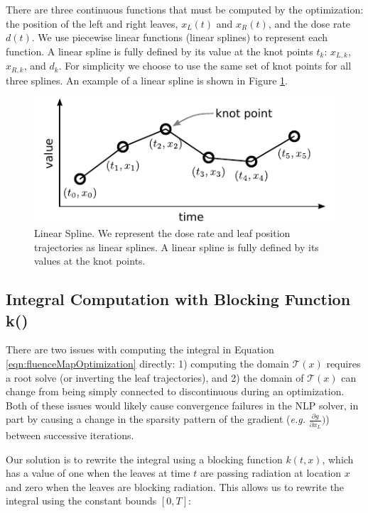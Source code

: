 \documentclass{iopart}
\begin{document}
There are three continuous functions that must be computed by the optimization: the position of the left and right leaves, $x_L(t)$ and $x_R(t)$, and the dose rate $d(t)$. We use piecewise linear functions (linear splines) to represent each function. A linear spline is fully defined by its value at the knot points $t_k$: $x_{L,k}$, $x_{R,k}$, and $d_k$. For simplicity we choose to use the same set of knot points for all three splines. An example of a linear spline is shown in Figure \ref{fig:linearSpline}.

\begin{figure}
  \centering
  \includegraphics{fig/linearSpline.pdf}
  \caption{Linear Spline. We represent the dose rate and leaf position trajectories as linear splines. A linear spline is fully defined by its values at the knot points. }
  \label{fig:linearSpline}
\end{figure}

\subsection{Integral Computation with Blocking Function k()}
\label{sec:IntegralComputationWithBlockingFunction}

There are two issues with computing the integral in Equation \ref{eqn:fluenceMapOptimization} directly: 1) computing the domain $\mathcal{T}(x)$ requires a root solve (or inverting the leaf trajectories), and 2) the domain of $\mathcal{T}(x)$ can change from being simply connected to discontinuous during an optimization. Both of these issues would likely cause convergence failures in the NLP solver, in part by causing a change in the sparsity pattern of the gradient
(\textit{e.g.} $\tfrac{\partial g}{\partial x_L})$)
between successive iterations.

Our solution is to rewrite the integral using a blocking function $k(t,x)$, which has a value of one when the leaves at time $t$ are passing radiation at location $x$ and zero when the leaves are blocking radiation. This allows us to rewrite the integral using the constant bounds $[0, T]$:
\end{document}
